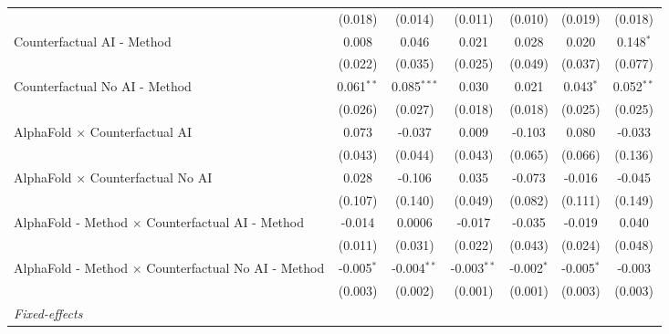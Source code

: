 \begin{tabular}{lcccccc}
                                                              & (0.018)       & (0.014)       & (0.011)       & (0.010)       & (0.019)       & (0.018)\\   
   Counterfactual AI - Method                                 & 0.008         & 0.046         & 0.021         & 0.028         & 0.020         & 0.148$^{*}$\\   
                                                              & (0.022)       & (0.035)       & (0.025)       & (0.049)       & (0.037)       & (0.077)\\   
   Counterfactual No AI - Method                              & 0.061$^{**}$  & 0.085$^{***}$ & 0.030         & 0.021         & 0.043$^{*}$   & 0.052$^{**}$\\   
                                                              & (0.026)       & (0.027)       & (0.018)       & (0.018)       & (0.025)       & (0.025)\\   
   AlphaFold $\times$ Counterfactual AI                       & 0.073         & -0.037        & 0.009         & -0.103        & 0.080         & -0.033\\   
                                                              & (0.043)       & (0.044)       & (0.043)       & (0.065)       & (0.066)       & (0.136)\\   
   AlphaFold $\times$ Counterfactual No AI                    & 0.028         & -0.106        & 0.035         & -0.073        & -0.016        & -0.045\\   
                                                              & (0.107)       & (0.140)       & (0.049)       & (0.082)       & (0.111)       & (0.149)\\   
   AlphaFold - Method $\times$ Counterfactual AI - Method     & -0.014        & 0.0006        & -0.017        & -0.035        & -0.019        & 0.040\\   
                                                              & (0.011)       & (0.031)       & (0.022)       & (0.043)       & (0.024)       & (0.048)\\   
   AlphaFold - Method $\times$ Counterfactual No AI - Method  & -0.005$^{*}$  & -0.004$^{**}$ & -0.003$^{**}$ & -0.002$^{*}$  & -0.005$^{*}$  & -0.003\\   
                                                              & (0.003)       & (0.002)       & (0.001)       & (0.001)       & (0.003)       & (0.003)\\   
   \midrule
   \emph{Fixed-effects}\\

\end{tabular}
